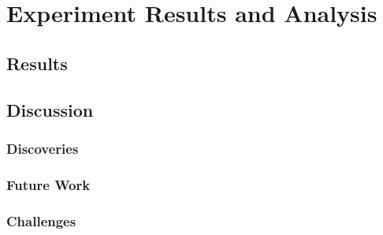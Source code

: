 \chapter{Experiment Results and Analysis}
\label{chapter:results-and-analysis}

\section{Results}
\label{sec:results}


\section{Discussion}
\label{sec:discussion}


\subsection{Discoveries}
\label{subsec:discoveries}


\subsection{Future Work}
\label{subsec:future-work}


\subsection{Challenges}
\label{subsec:challenges}

